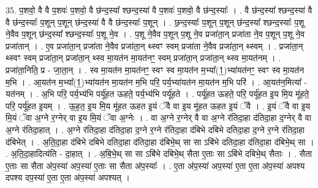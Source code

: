 \documentclass[17pt]{extarticle}
\begin{document}
35. प॒शवो॒ वै वै प॒शवः॑ प॒शवो॒ वै छ॑न्द॒स्या᳚ श्छन्द॒स्या॑ वै प॒शवः॑ प॒शवो॒ वै छ॑न्द॒स्याः᳚ । . वै छ॑न्द॒स्या᳚ श्छन्द॒स्या॑ वै वै छ॑न्द॒स्याः᳚ प॒शून् प॒शून् छ॑न्द॒स्या॑ वै वै छ॑न्द॒स्याः᳚ प॒शून् । . छ॒न्द॒स्याः᳚ प॒शून् प॒शून् छ॑न्द॒स्या᳚ श्छन्द॒स्याः᳚ प॒शू ने॒वैव प॒शून् छ॑न्द॒स्या᳚ श्छन्द॒स्याः᳚ प॒शू ने॒व । . प॒शू ने॒वैव प॒शून् प॒शू ने॒व प्रजा॑ता॒न् प्रजा॑ता ने॒व प॒शून् प॒शू ने॒व प्रजा॑तान् । . ए॒व प्रजा॑ता॒न् प्रजा॑ता ने॒वैव प्रजा॑ता॒न् थ्स्वꣳ स्वम् प्रजा॑ता ने॒वैव प्रजा॑ता॒न् थ्स्वम् । . प्रजा॑ता॒न् थ्स्वꣳ स्वम् प्रजा॑ता॒न् प्रजा॑ता॒न् थ्स्व मा॒यत॑न मा॒यत॑नꣳ॒॒ स्वम् प्रजा॑ता॒न् प्रजा॑ता॒न् थ्स्व मा॒यत॑नम् । . प्रजा॑ता॒निति॒ प्र - जा॒ता॒न् । . स्व मा॒यत॑न मा॒यत॑नꣳ॒॒ स्वꣳ स्व मा॒यत॑न म॒भ्या᳚(1॒)भ्या॑यत॑नꣳ॒॒ स्वꣳ स्व मा॒यत॑न म॒भि । . आ॒यत॑न म॒भ्या᳚(1॒)भ्या॑यत॑न मा॒यत॑न म॒भि परि॒ पर्य॒भ्या॑यत॑न मा॒यत॑न म॒भि परि॑ । . आ॒यत॑न॒मित्या᳚ - यत॑नम् । . अ॒भि परि॒ पर्य॒भ्य॑भि पर्यू॑हत ऊहते॒ पर्य॒भ्य॑भि पर्यू॑हते । . पर्यू॑हत ऊहते॒ परि॒ पर्यू॑हत इ॒य मि॒य मू॑हते॒ परि॒ पर्यू॑हत इ॒यम् । . ऊ॒ह॒त॒ इ॒य मि॒य मू॑हत ऊहत इ॒यं ॅवै वा इ॒य मू॑हत ऊहत इ॒यं ॅवै । . इ॒यं ॅवै वा इ॒य मि॒यं ॅवा अ॒ग्ने र॒ग्नेर् वा इ॒य मि॒यं ॅवा अ॒ग्नेः । . वा अ॒ग्ने र॒ग्नेर् वै वा अ॒ग्ने र॑तिदा॒हा द॑तिदा॒हा द॒ग्नेर् वै वा अ॒ग्ने र॑तिदा॒हात् । . अ॒ग्ने र॑तिदा॒हा द॑तिदा॒हा द॒ग्ने र॒ग्ने र॑तिदा॒हा द॑बिभे दबिभे दतिदा॒हा द॒ग्ने र॒ग्ने र॑तिदा॒हा द॑बिभेत् । . अ॒ति॒दा॒हा द॑बिभे दबिभे दतिदा॒हा द॑तिदा॒हा द॑बिभे॒थ् सा सा ऽबि॑भे दतिदा॒हा द॑तिदा॒हा द॑बिभे॒थ् सा । . अ॒ति॒दा॒हादित्य॑ति - दा॒हात् । . अ॒बि॒भे॒थ् सा सा ऽबि॑भे दबिभे॒थ् सैता ए॒ताः सा ऽबि॑भे दबिभे॒थ् सैताः । . सैता ए॒ताः सा सैता अ॑प॒स्या॑ अप॒स्या॑ ए॒ताः सा सैता अ॑प॒स्याः᳚ । . ए॒ता अ॑प॒स्या॑ अप॒स्या॑ ए॒ता ए॒ता अ॑प॒स्या॑ अपश्य दपश्य दप॒स्या॑ ए॒ता ए॒ता अ॑प॒स्या॑ अपश्यत् । \newline
\pagebreak
{}
\end{document}
